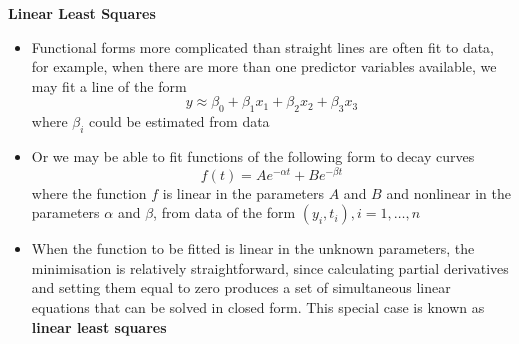 \documentclass[landscape]{slides}
\newcommand{\heading}[1]{%
  \begin{center}
    \large\bf \color{red}
        #1
  \end{center}
  \vspace{1ex minus 1ex}}
\begin{document}
\begin{slide}
\heading{Linear Least Squares}
\begin{itemize}

\item Functional forms more complicated than straight lines are often fit to data,
for example, when there are more than one predictor variables available, we may
fit a line of the form
$$y\approx \beta_0+\beta_1x_1+\beta_2x_2+\beta_3x_3$$
where $\beta_i$ could be estimated from data
%

\item Or we may be able to fit functions of the following form to decay curves
$$f(t)=Ae^{-\alpha t}+Be^{-\beta t}$$
where the function $f$ is linear in the parameters $A$ and $B$ and nonlinear
in the parameters $\alpha$ and $\beta$,  
from data of the form $(y_i,t_i), i=1,\ldots,n$

\item When the function to be fitted is linear in the unknown parameters, the 
minimisation is relatively straightforward, since calculating partial derivatives
and setting them equal to zero produces a set of simultaneous linear equations
that can be solved in closed form. This special case is known as {\bf linear
least squares}
\end{itemize}
\end{slide}
\end{document}
